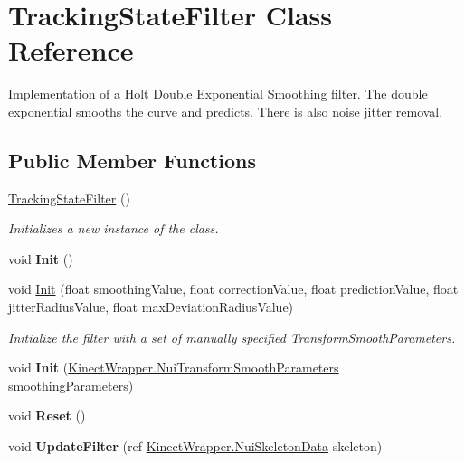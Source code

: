 \hypertarget{class_tracking_state_filter}{}\section{Tracking\+State\+Filter Class Reference}
\label{class_tracking_state_filter}


Implementation of a Holt Double Exponential Smoothing filter. The double exponential smooths the curve and predicts. There is also noise jitter removal.  


\subsection*{Public Member Functions}
\begin{DoxyCompactItemize}
\item 
\mbox{\label{class_tracking_state_filter_a5b6bbc0762bd99b07d858927149f8e99}} 
\mbox{\hyperlink{class_tracking_state_filter_a5b6bbc0762bd99b07d858927149f8e99}{Tracking\+State\+Filter}} ()
\begin{DoxyCompactList}\small\item\em Initializes a new instance of the class. \end{DoxyCompactList}\item 
\mbox{\label{class_tracking_state_filter_a93adcb0571eed573d08d29df99c052d2}} 
void {\bfseries Init} ()
\item 
void \mbox{\hyperlink{class_tracking_state_filter_a04be8b493efd27ca4e283194b0c88345}{Init}} (float smoothing\+Value, float correction\+Value, float prediction\+Value, float jitter\+Radius\+Value, float max\+Deviation\+Radius\+Value)
\begin{DoxyCompactList}\small\item\em Initialize the filter with a set of manually specified Transform\+Smooth\+Parameters. \end{DoxyCompactList}\item 
\mbox{\label{class_tracking_state_filter_a94f28ab818af63dc0dbff981471b9155}} 
void {\bfseries Init} (\mbox{\hyperlink{struct_kinect_wrapper_1_1_nui_transform_smooth_parameters}{Kinect\+Wrapper.\+Nui\+Transform\+Smooth\+Parameters}} smoothing\+Parameters)
\item 
\mbox{\label{class_tracking_state_filter_aaebd55fd1665a15ec96813b24acee475}} 
void {\bfseries Reset} ()
\item 
\mbox{\label{class_tracking_state_filter_a32f3730ec7efc024aa0b3776634e5126}} 
void {\bfseries Update\+Filter} (ref \mbox{\hyperlink{struct_kinect_wrapper_1_1_nui_skeleton_data}{Kinect\+Wrapper.\+Nui\+Skeleton\+Data}} skeleton)
\end{DoxyCompactItemize}
